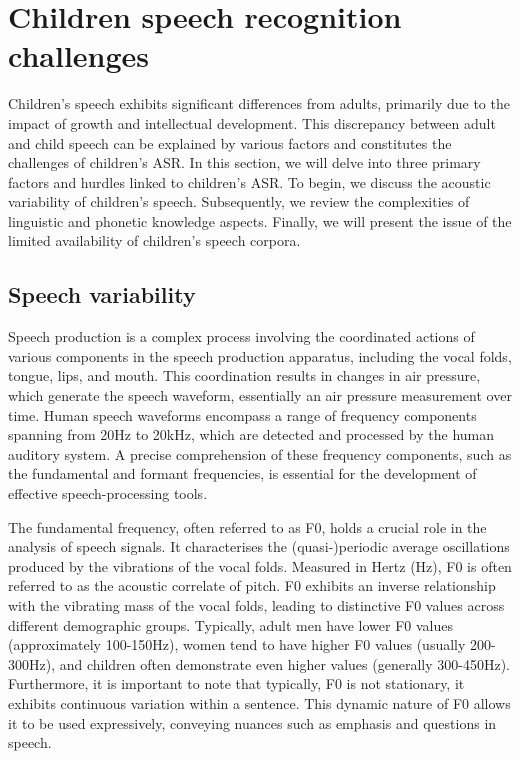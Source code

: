 \section{Children speech  recognition challenges}%
\label{section:Children_seepch_challenges}
Children's speech exhibits significant differences from adults, primarily due to the impact of growth and intellectual development. This discrepancy between adult and child speech can be explained by various factors and constitutes the challenges of children's ASR. In this section, we will delve into three primary factors and hurdles linked to children's ASR. To begin, we discuss the acoustic variability of children's speech. Subsequently, we review the complexities of linguistic and phonetic knowledge aspects. Finally, we will present the issue of the limited availability of children's speech corpora.
\subsection{Speech variability}%
Speech production is a complex process involving the coordinated actions of various components in the speech production apparatus, including the vocal folds, tongue, lips, and mouth. This coordination results in changes in air pressure, which generate the speech waveform, essentially an air pressure measurement over time. Human speech waveforms encompass a range of frequency components spanning from 20Hz to 20kHz, which are detected and processed by the human auditory system. A precise comprehension of these frequency components, such as the fundamental and formant frequencies, is essential for the development of effective speech-processing tools.

The fundamental frequency, often referred to as F0, holds a crucial role in the analysis of speech signals. It characterises the (quasi-)periodic average oscillations produced by the vibrations of the vocal folds. Measured in Hertz (Hz), F0 is often referred to as the acoustic correlate of pitch. F0 exhibits an inverse relationship with the vibrating mass of the vocal folds, leading to distinctive F0 values across different demographic groups. Typically, adult men have lower F0 values (approximately 100-150Hz), women tend to have higher F0 values (usually 200-300Hz), and children often demonstrate even higher values (generally 300-450Hz). Furthermore, it is important to note that typically, F0 is not stationary, it exhibits continuous variation within a sentence. This dynamic nature of F0 allows it to be used expressively, conveying nuances such as emphasis and questions in speech.

